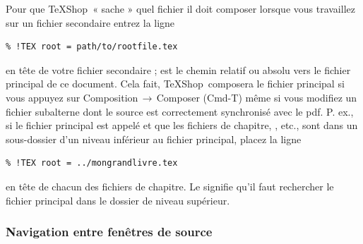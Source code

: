 \documentclass[11pt,french]{article}
\newcommand{\TS}{\textsf{\TeX Shop}}
\newcommand{\acr}[1]{\textsf{#1}}
\newcommand{\cmd}[1]{\textsf{#1}}
\newcommand{\mnu}[1]{\textsf{#1}}
\newcommand{\To}{\,\(\to\)\,}
\begin{document}
Pour que \TS\ « sache » quel fichier il doit composer lorsque vous travaillez sur un fichier secondaire entrez la ligne \begin{verbatim}
% !TEX root = path/to/rootfile.tex
\end{verbatim}
en tête de votre fichier secondaire ;  est le chemin relatif ou absolu vers le fichier principal de ce document. Cela fait, \TS\ composera le fichier principal si vous appuyez sur \mnu{Composition}\To\mnu{Composer} (\cmd{Cmd-T}) même si vous modifiez un fichier subalterne dont le source est correctement synchronisé avec le \acr{pdf}. P. ex., si le fichier principal est appelé  et que les fichiers de chapitre, , etc., sont dans un sous-dossier  d'un niveau inférieur au fichier principal, placez la ligne
\begin{verbatim}
% !TEX root = ../mongrandlivre.tex
\end{verbatim}
en tête de chacun des fichiers de chapitre. Le  signifie qu'il faut rechercher le fichier principal dans le dossier de niveau supérieur.

%

\subsubsection{Navigation entre fenêtres de source}
\end{document}
